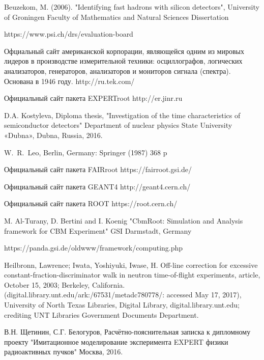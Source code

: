 \begin{thebibliography}{999}
	Beuzekom, M. (2006). "Identifying fast hadrons with silicon detectors", University of Groningen Faculty of Mathematics and Natural Sciences Dissertation
	
	https://www.psi.ch/drs/evaluation-board
	
	Офциальный сайт американской корпорации, являющейся одним из мировых лидеров в производстве измерительной техники: осциллографов, логических анализаторов, генераторов, анализаторов и мониторов сигнала (спектра). Основана в 1946 году.
	http://ru.tek.com/
	
	Официальный сайт пакета EXPERTroot
	http://er.jinr.ru
	
	D.A. Kostyleva, Diploma thesis,
	"Investigation of the time characteristics of semiconductor detectors"
	Department of nuclear physics
	State University «Dubna», Dubna, Russia, 2016.
	
	W.~R.~Leo,
	Berlin, Germany: Springer (1987) 368 p

	Официальный сайт пакета FAIRroot
	https://fairroot.gsi.de/
	
	Официальный сайт пакета GEANT4
	http://geant4.cern.ch/

	Официальный сайт пакета ROOT
	https://root.cern.ch/

	M. Al-Turany, D. Bertini and I. Koenig
	"CbmRoot: Simulation and Analysis framework for CBM Experiment"
	GSI Darmstadt, Germany
	
	https://panda.gsi.de/oldwww/framework/computing.php

	Heilbronn, Lawrence; Iwata, Yoshiyuki, Iwase, H. Off-line correction for excessive constant-fraction-discriminator walk in neutron time-of-flight experiments, article, October 15, 2003; Berkeley, California. (digital.library.unt.edu/ark:/67531/metadc780778/: accessed May 17, 2017), University of North Texas Libraries, Digital Library, digital.library.unt.edu; crediting UNT Libraries Government Documents Department.
	
	
	В.Н. Щетинин, С.Г. Белогуров,
	Расчётно-пояснительная записка к дипломному проекту
 	"Имитационное моделирование эксперимента EXPERT 
	физики радиоактивных пучков"
	Москва, 2016.
	
\end{thebibliography}